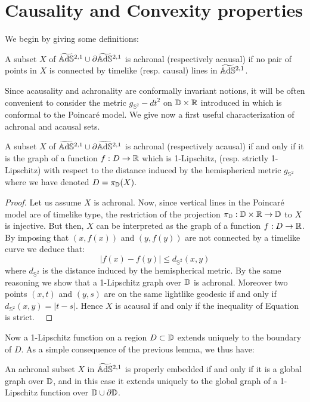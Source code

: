 \section{Causality and Convexity properties}
We begin by giving some definitions:
\begin{definition}
    A subset $X$ of $\widetilde{\mathbb{A}\mathrm{d}\mathbb{S}}{}^{2,1}\cup \partial\widetilde{\mathbb{A}\mathrm{d}\mathbb{S}}{}^{2,1}$ is achronal (respectively acausal) if no pair of points in $X$ is connected by timelike (resp. causal) lines in $\widetilde{\mathbb{A}\mathrm{d}\mathbb{S}}{}^{2,1}$.
\end{definition}
Since acausality and achronality are conformally invariant notions, it will be often convenient to consider the metric $g_{\mathbb{S}^2}-dt^2$ on $\mathbb{D}\times\mathbb{R}$ introduced in  which is conformal to the Poincaré model. We give now a first useful characterization of achronal and acausal sets.
\begin{lemma}
    A subset $X$ of $\widetilde{\mathbb{A}\mathrm{d}\mathbb{S}}{}^{2,1}\cup \partial\widetilde{\mathbb{A}\mathrm{d}\mathbb{S}}{}^{2,1}$ is achronal (respectively acausal) if and only if it is the graph of a function $f:D\to\mathbb{R}$ which is 1-Lipschitz, (resp. strictly 1-Lipschitz) with respect to the distance induced by the hemispherical metric $g_{\mathbb{S}^2}$ where we have denoted $D=\pi_{\mathbb{D}}(X).$ 
\end{lemma}
\begin{proof}
     Let us assume $X$ is achronal. Now, since vertical lines in the Poincaré model are of timelike type, the restriction of the projection $\pi_{\mathbb{D}}:\mathbb{D}\times\mathbb{R}\to\mathbb{D}$ to $X$ is injective. But then, $X$ can be interpreted as the graph of a function $f:D\to\mathbb{R}$. By imposing that $(x,f(x))$ and $(y,f(y))$ are not connected by a timelike curve we deduce that: 
     \begin{equation}\label{soloqua}
        |f(x)-f(y)|\leq d_{\mathbb{S}^2}(x,y)
     \end{equation}
     where $d_{\mathbb{S}^2}$ is the distance induced by the hemispherical metric. By the same reasoning we show that a 1-Lipschitz graph over $\mathbb{D}$ is achronal. Moreover two points $(x,t)$ and $(y,s)$ are on the same lightlike geodesic if and only if $d_{\mathbb{S}^2}(x,y)=|t-s|$. Hence $X$ is acausal if and only if the inequality of Equation  is strict. \
\end{proof}

Now a 1-Lipschitz function on a region $D\subset \mathbb{D}$ extends uniquely to the boundary of $D$. As a simple consequence of the previous lemma, we thus have: 

\begin{lemma}\label{achronalgraph}
    An achronal subset $X$ in $\widetilde{\mathbb{A}\mathrm{d}\mathbb{S}}{}^{2,1}$ is properly embedded if and only if it is a global graph over $\mathbb{D}$, and in this case it extends uniquely to the global graph of a 1-Lipschitz function over $\mathbb{D}\cup\partial\mathbb{D}$.
\end{lemma}

